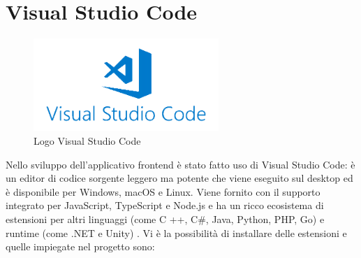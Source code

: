 \section{Visual Studio Code}
\begin{figure}[ht!]
\begin{center}
  \includegraphics[width=7cm]{images/VSCode.png}
  \caption{Logo Visual Studio Code}
\end{center}
\end{figure}
Nello sviluppo dell'applicativo frontend è stato fatto uso di Visual Studio Code: è un editor di codice sorgente leggero ma potente che viene eseguito sul desktop ed è disponibile per Windows, macOS e Linux. Viene fornito con il supporto integrato per JavaScript, TypeScript e Node.js e ha un ricco ecosistema di estensioni per altri linguaggi (come C ++, C\#, Java, Python, PHP, Go) e runtime (come .NET e Unity) \cite{VSCode}. Vi è la possibilità di installare delle estensioni e quelle impiegate nel progetto sono:
